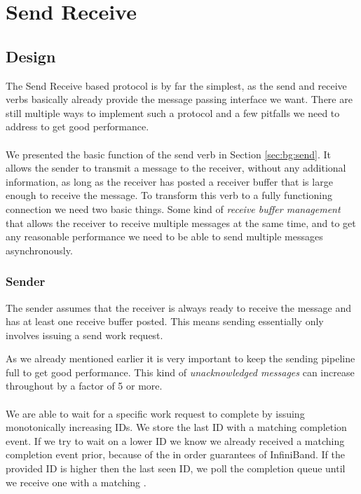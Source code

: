 \section{Send Receive} \label{sec:conn:send}\label{sendrcv}
\subsection{Design} \label{sendrcv-design}
The Send Receive based protocol is by far the simplest, as the send and receive verbs basically already provide the 
message passing interface we want. There are still multiple ways to implement such a protocol and a few pitfalls 
we need to address to get good performance.

\paragraph{} We presented the basic function of the send verb in Section \ref{sec:bg:send}. It allows the sender to transmit 
a message to the receiver, without any additional information, as long as the receiver has posted a receiver buffer that is 
large enough to receive the message. To transform this verb to a fully functioning connection we need two basic things. 
Some kind of \emph{receive buffer management} that allows the receiver to receive multiple messages at the same time, 
and to get any reasonable performance we need to be able to send multiple messages asynchronously.

\subsubsection{Sender} 
The sender assumes that the receiver is always ready to receive the message and has at least one receive buffer posted. This
means sending essentially only involves issuing a send work request.

As we already mentioned earlier it is very important to keep the sending pipeline full to get good performance. 
This kind of \emph{unacknowledged messages} can increase throughout by a factor of 5 or more.

\paragraph{} We are able to wait for a specific work request to complete by issuing monotonically increasing IDs. We store the
last ID with a matching completion event. If we try to wait on a lower ID we know we already received a matching completion 
event prior, because of the in order guarantees of InfiniBand. If the provided ID is higher then the
last seen ID, we  poll the completion queue until we receive one with a matching .

